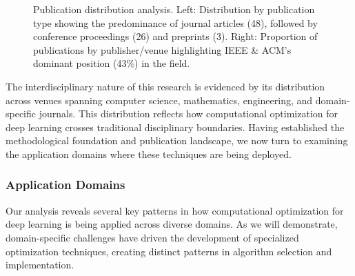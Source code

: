 \begin{figure}[h]
\centering
{}
\hspace{0.05\textwidth}
\caption{Publication distribution analysis. Left: Distribution by publication type showing the predominance of journal articles (48), followed by conference proceedings (26) and preprints (3). Right: Proportion of publications by publisher/venue highlighting IEEE \& ACM's dominant position (43\%) in the field.}
\label{fig:publication_distribution}
\end{figure}

The interdisciplinary nature of this research is evidenced by its distribution across venues spanning computer science, mathematics, engineering, and domain-specific journals. This distribution reflects how computational optimization for deep learning crosses traditional disciplinary boundaries. Having established the methodological foundation and publication landscape, we now turn to examining the application domains where these techniques are being deployed.

\subsubsection{Application Domains}
Our analysis reveals several key patterns in how computational optimization for deep learning is being applied across diverse domains. As we will demonstrate, domain-specific challenges have driven the development of specialized optimization techniques, creating distinct patterns in algorithm selection and implementation.

